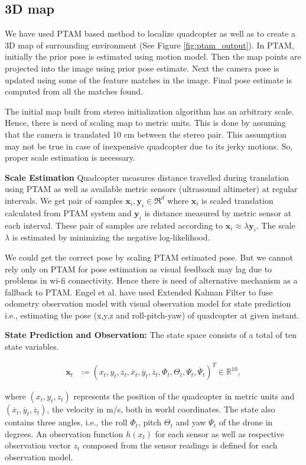 \subsection{ 3D map }
We have used PTAM based method \cite{engel} to localize quadcopter as well as to
create a 3D map of surrounding environment (See Figure \ref{fig:ptam_output}).
In PTAM, initially the prior pose is estimated using motion model. Then the map
points are projected into the image using prior pose estimate. Next the camera
pose is updated using some of the feature matches in the image. Final pose
estimate is computed from all the matches found.
 
The initial map built from stereo initialization algorithm has an arbitrary
scale. Hence, there is need of scaling map to metric units. This is done by
assuming that the camera is translated 10 cm between the stereo pair. This
assumption may not be true in case of inexpensive quadcopter due to its jerky
motions. So, proper scale estimation is necessary.

\textbf{Scale Estimation}
Quadcopter measures distance travelled during translation using PTAM as well as
available metric sensors (ultrasound altimeter) at regular intervals. We get
pair of samples $\mathbf{x}_i, \mathbf{y}_i \in {\Re}^d$ where $\mathbf{x}_i$ is
scaled translation calculated from PTAM system and $\mathbf{y}_i$ is distance
measured by metric sensor at each interval. These pair of samples are related
according to $\mathbf{x}_i \approx \lambda \mathbf{y}_i$. The scale $\lambda$ is
estimated by minimizing the negative log-likelihood\cite{engel}.  

We could get the correct pose by  scaling  PTAM estimated pose. But we
cannot rely only on PTAM for pose estimation as visual feedback may lag due to
problems in wi-fi connectivity. Hence there is need of  alternative
mechanism as a fallback to PTAM. Engel et al. \cite{engel} have used Extended
Kalman Filter to fuse odometry observation model with visual observation model for state prediction i.e.,
estimating the pose (x,y,z and roll-pitch-yaw) of quadcopter at given  instant.

\textbf{State Prediction and Observation:} The state space consists of a total
of ten state variables. 
\begin{ceqn}
\begin{align}
	\mathbf{x}_t &\coloneqq {(x_t, y_t, z_t, \dot{x_t}, \dot{y_t},
	\dot{z_t}, {\Phi}_t, {\Theta}_t, {\Psi}_t, \dot{{\Psi}_t} )}^T  \in
	{\mathbb{R}}^{10},
\end{align}
\end{ceqn}
where $(x_t, y_t, z_t)$ represents the position of the quadcopter in
metric units and $(\dot{x_t}, \dot{y_t}, \dot{z_t})$, the velocity in m/s, both
in world coordinates. The state also contains three angles, i.e., the roll
${\Phi}_t$, pitch ${\Theta}_t$ and yaw ${\Psi}_t$ of the drone in degrees.  An observation
function $h(x_t)$ for each sensor as well as respective observation vector $z_t$
composed from the sensor readings is defined for each observation model.

